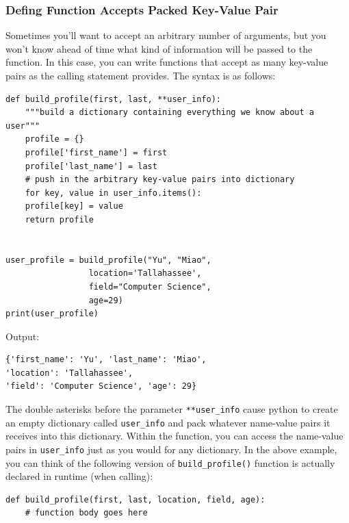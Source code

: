 \documentclass[12pt]{book}
\begin{document}
\subsubsection{Defing Function Accepts Packed Key-Value Pair}
\label{sec:org5c8fc1a}
Sometimes you’ll want to accept an arbitrary number of arguments, but you won’t know ahead of time what kind of information will be passed to the function. In this case, you can write functions that accept as many key-value pairs as the calling statement provides. The syntax is as follows:
\begin{verbatim}
def build_profile(first, last, **user_info):
    """build a dictionary containing everything we know about a user"""
    profile = {}
    profile['first_name'] = first
    profile['last_name'] = last
    # push in the arbitrary key-value pairs into dictionary
    for key, value in user_info.items():
	profile[key] = value
    return profile


user_profile = build_profile("Yu", "Miao",
			     location='Tallahassee',
			     field="Computer Science",
			     age=29)
print(user_profile)

\end{verbatim}
Output:
\begin{verbatim}
{'first_name': 'Yu', 'last_name': 'Miao',
'location': 'Tallahassee',
'field': 'Computer Science', 'age': 29}
\end{verbatim}
The double asterisks before the parameter \texttt{**user\_info} cause python to create an empty dictionary called \texttt{user\_info} and pack whatever name-value pairs it receives into this dictionary. Within the function, you can access the name-value pairs in \texttt{user\_info} just as you would for any dictionary. In the above example, you can think of the following version of \texttt{build\_profile()} function is actually declared in runtime (when calling):
\begin{verbatim}
def build_profile(first, last, location, field, age):
    # function body goes here
\end{verbatim}
\end{document}
